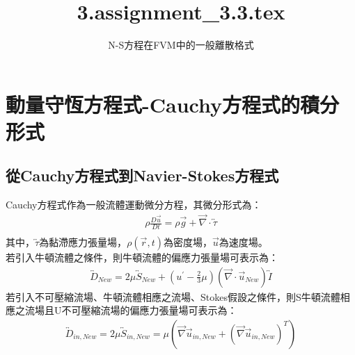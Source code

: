 \documentclass[12pt]{article}
\title{3.assignment\_3.3.tex}
\author{N-S方程在FVM中的一般離散格式}
\theoremstyle{upright}
\begin{document}
\maketitle
\tableofcontents
\newpage


\section {動量守恆方程式-Cauchy方程式的積分形式}
\subsection{從Cauchy方程式到Navier-Stokes方程式}
\noindent Cauchy方程式作為一般流體運動微分方程，其微分形式為：
\begin{equation}
\begin{aligned}
\rho \frac{D \vec{u}}{Dt} = \rho\vec{g} + \vec{\nabla}\cdot \overleftrightarrow{\tau} \\
\end{aligned}
\end{equation}
\noindent 其中，$\overleftrightarrow{\tau}$為黏滯應力張量場，$\rho(\vec{r},t)$為密度場，$\vec{u}$為速度場。\\
\noindent 若引入牛頓流體之條件，則牛頓流體的偏應力張量場可表示為：
\begin{equation}
\begin{aligned}
    \overleftrightarrow{D}_{New} = 2\mu\overleftrightarrow{S}_{New} + (u^{\prime} - \frac{2}{3}\mu)(\vec{\nabla}\cdot \vec{u}_{New})\overleftrightarrow{I}
\end{aligned}
\end{equation}
\noindent 若引入不可壓縮流場、牛頓流體相應之流場、Stokes假設之條件，則S牛頓流體相應之流場且U不可壓縮流場的偏應力張量場可表示為：\\
\begin{equation}\begin{aligned}
    \overleftrightarrow{D}_{in,New} = 2\mu\overleftrightarrow{S}_{in,New} = \mu\left(\vec{\nabla}\vec{u}_{in,New}  + \left(\vec{\nabla}\vec{u}_{in,New}\right)^{T}\right)
\end{aligned}\end{equation}
\end{document}
